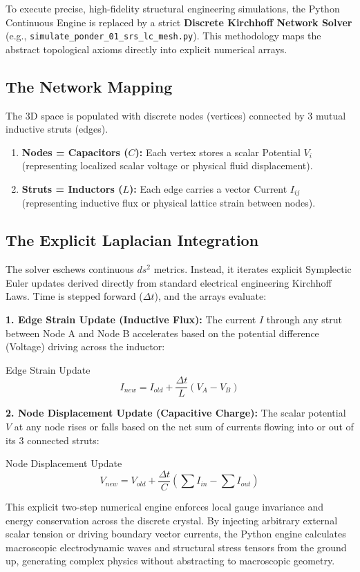 To execute precise, high-fidelity structural engineering simulations, the Python Continuous Engine is replaced by a strict \textbf{Discrete Kirchhoff Network Solver} (e.g., \texttt{simulate\_ponder\_01\_srs\_lc\_mesh.py}). This methodology maps the abstract topological axioms directly into explicit numerical arrays.

\subsection{The Network Mapping}
The 3D space is populated with discrete nodes (vertices) connected by 3 mutual inductive struts (edges).
\begin{enumerate}
    \item \textbf{Nodes = Capacitors ($C$):} Each vertex stores a scalar Potential $V_i$ (representing localized scalar voltage or physical fluid displacement).
    \item \textbf{Struts = Inductors ($L$):} Each edge carries a vector Current $I_{ij}$ (representing inductive flux or physical lattice strain between nodes).
\end{enumerate}

\subsection{The Explicit Laplacian Integration}
The solver eschews continuous $ds^2$ metrics. Instead, it iterates explicit Symplectic Euler updates derived directly from standard electrical engineering Kirchhoff Laws. Time is stepped forward ($\Delta t$), and the arrays evaluate:

\textbf{1. Edge Strain Update (Inductive Flux):}
The current $I$ through any strut between Node A and Node B accelerates based on the potential difference (Voltage) driving across the inductor:
\begin{resultbox}{Edge Strain Update}
\begin{equation}
    I_{new} = I_{old} + \frac{\Delta t}{L} \left( V_A - V_B \right)
\end{equation}
\end{resultbox}

\textbf{2. Node Displacement Update (Capacitive Charge):}
The scalar potential $V$ at any node rises or falls based on the net sum of currents flowing into or out of its 3 connected struts:
\begin{resultbox}{Node Displacement Update}
\begin{equation}
    V_{new} = V_{old} + \frac{\Delta t}{C} \left( \sum I_{in} - \sum I_{out} \right)
\end{equation}
\end{resultbox}

This explicit two-step numerical engine enforces local gauge invariance and energy conservation across the discrete crystal. By injecting arbitrary external scalar tension or driving boundary vector currents, the Python engine calculates macroscopic electrodynamic waves and structural stress tensors from the ground up, generating complex physics without abstracting to macroscopic geometry.